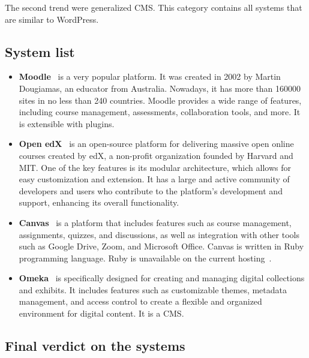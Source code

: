 \documentclass[
  digital,     %
  oneside,     %
  nosansbold,  %
  colorbold, %
  lof,         %
  lot,         %
]{fithesis4}
\begin{document}
The second trend were generalized CMS. This category contains all systems that are similar to WordPress.

\subsection{System list}

\begin{itemize}

	\item \textbf{Moodle}~\cite{moodle} is a very popular platform. It was created in 2002 by Martin Dougiamas,
	an educator from Australia. Nowadays, it has more than 160000 sites in no less than 240 countries. Moodle
	provides a wide range of features, including course management, assessments, collaboration tools, and more.
	It	is extensible with plugins.

	\newpage
	
	\item \textbf{Open edX}~\cite{openedx} is an open-source platform for delivering massive open online
	courses created by edX, a non-profit organization founded by Harvard and MIT. One of the key features is
	its modular architecture, which allows for easy customization and extension. It has a large and active
	community of developers and users who contribute to the platform's development and support, enhancing
	its overall functionality.

	\item \textbf{Canvas}~\cite{canvas} is a platform that includes features such as course management,
	assignments, quizzes, and discussions, as well as integration with other tools such as Google Drive, Zoom,
	and Microsoft Office. Canvas is written in Ruby programming language. Ruby is unavailable on the current
	hosting~\cite{forpsi_data}.

	\item \textbf{Omeka}~\cite{omeka} is specifically designed for creating and managing digital collections and
	exhibits. It includes features such as customizable themes, metadata management, and access control to
	create a flexible and organized environment for digital content. It is a CMS.

\end{itemize}

\subsection{Final verdict on the systems}
\end{document}
